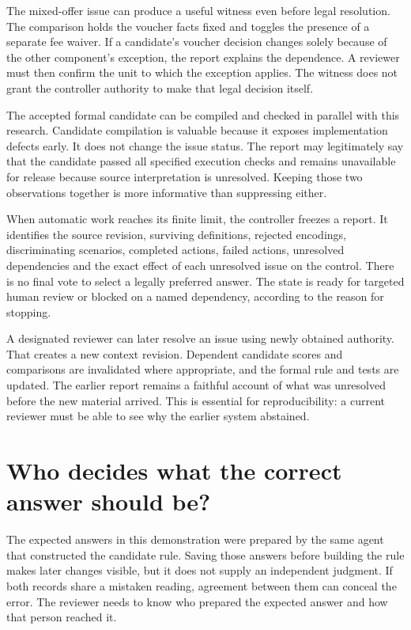\documentclass[12pt,a4paper,oneside,openany]{book}
\begin{document}
The mixed-offer issue can produce a useful witness even before legal resolution.
The comparison holds the voucher facts fixed and toggles the presence of a
separate fee waiver. If a candidate's voucher decision changes solely because
of the other component's exception, the report explains the dependence. A
reviewer must then confirm the unit to which the exception applies. The witness
does not grant the controller authority to make that legal decision itself.

The accepted formal candidate can be compiled and checked in parallel with this
research. Candidate compilation is valuable because it exposes implementation
defects early. It does not change the issue status. The report may legitimately
say that the candidate passed all specified execution checks and remains
unavailable for release because source interpretation is unresolved. Keeping
those two observations together is more informative than suppressing either.

When automatic work reaches its finite limit, the controller freezes a report.
It identifies the source revision, surviving definitions, rejected encodings,
discriminating scenarios, completed actions, failed actions, unresolved
dependencies and the exact effect of each unresolved issue on the control.
There is no final vote to select a legally preferred answer. The state is ready
for targeted human review or blocked on a named dependency, according to the
reason for stopping.

A designated reviewer can later resolve an issue using newly obtained authority.
That creates a new context revision. Dependent candidate scores and comparisons
are invalidated where appropriate, and the formal rule and tests are updated.
The earlier report remains a faithful account of what was unresolved before the
new material arrived. This is essential for reproducibility: a current reviewer
must be able to see why the earlier system abstained.

\section{Who decides what the correct answer should be?}
\label{merge:M02:08}

\label{sec:circular-independent}
The expected answers in this demonstration were prepared by the same agent that
constructed the candidate rule. Saving those answers before building the rule
makes later changes visible, but it does not supply an independent judgment.
If both records share a mistaken reading, agreement between them can conceal
the error. The reviewer needs to know who prepared the expected answer and how
that person reached it.
\end{document}
